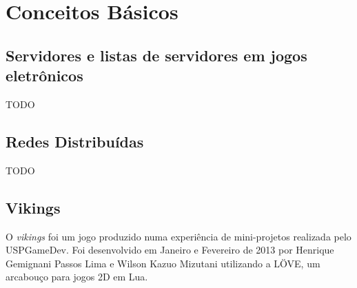 \chapter{Conceitos Básicos}
\label{sec:conceitos}

\section{Servidores e listas de servidores em jogos eletrônicos}
\label{sec:conceitos:servidores}
    TODO

\section{Redes Distribuídas}
\label{sec:conceitos:redes}
    TODO

\section{Vikings}
\label{sec:conceitos:vikings}
    O \textit{vikings} foi um jogo produzido numa experiência de mini-projetos realizada pelo USPGameDev\footnotemark. 
      Foi desenvolvido em Janeiro e Fevereiro de 2013 por Henrique Gemignani Passos Lima e Wilson Kazuo Mizutani 
      utilizando a LÖVE, um arcabouço para jogos 2D em Lua.


